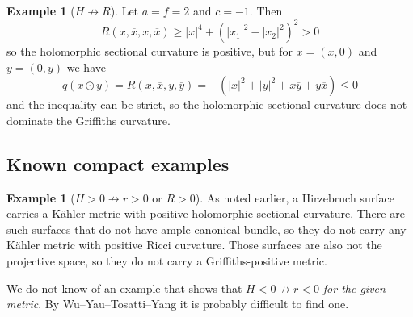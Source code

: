 \documentclass[10pt,a4paper]{amsart}
\theoremstyle{definition}
\newtheorem{exam}[theo]{Example}
\def\ov#1{\overline{#1}}
\begin{document}
\begin{exam}[$H \not\to R$]
Let $a = f = 2$ and $c = -1$.
Then
$$
R(x, \ov x, x, \ov x)
\geq |x|^4 + (|x_1|^2 - |x_2|^2)^2 > 0
$$
so the holomorphic sectional curvature is positive, but
for $x = (x,0)$ and $y = (0,y)$ we have
$$
q(x \odot y)
= R(x, \ov x, y, \ov y)
= - (|x|^2 + |y|^2 + x \ov y + y \ov x)
\leq 0
$$
and the inequality can be strict, so the holomorphic sectional curvature does
not dominate the Griffiths curvature.
\end{exam}


\subsection*{Known compact examples}


\begin{exam}[$H > 0 \not\to r > 0$ or $R > 0$]
As noted earlier, a Hirzebruch surface carries a K\"ahler metric with positive
holomorphic sectional curvature. There are such surfaces that do not have ample
canonical bundle, so they do not carry any K\"ahler metric with positive Ricci
curvature.
Those surfaces are also not the projective space, so they do not carry a
Griffiths-positive metric.
\end{exam}

We do not know of an example that shows that $H < 0 \not\to r < 0$ \emph{for
the given metric}.
By Wu--Yau--Tosatti--Yang it is probably difficult to find one.




\end{document}
